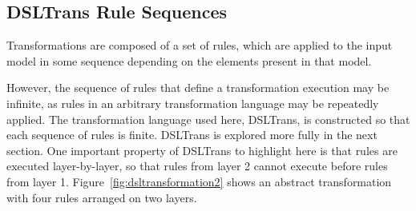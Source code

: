 % 
% 
% 

\subsection{DSLTrans Rule Sequences}

Transformations are composed of a set of rules, which are applied to the input
model in some sequence depending on the elements present in that model. 

However, the sequence of rules that define a transformation execution may be infinite, as rules in an arbitrary transformation language may be repeatedly applied. The transformation language used here,
DSLTrans, is constructed so that each sequence of rules is finite. DSLTrans is explored more fully in the next section. One
important property of DSLTrans to highlight here is that rules are executed layer-by-layer, so that
rules from layer 2 cannot execute before rules from layer 1. Figure~\ref{fig:dsltransformation2} shows an abstract transformation with four rules arranged on two layers.

